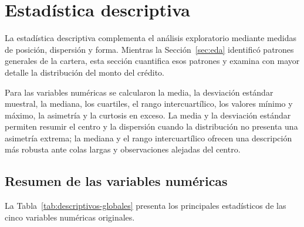 \section{Estadística descriptiva}
\label{sec:descriptiva}

La estadística descriptiva complementa el análisis exploratorio mediante
medidas de posición, dispersión y forma. Mientras la
Sección~\ref{sec:eda} identificó patrones generales de la cartera, esta
sección cuantifica esos patrones y examina con mayor detalle la
distribución del monto del crédito.

Para las variables numéricas se calcularon la media, la desviación
estándar muestral, la mediana, los cuartiles, el rango intercuartílico,
los valores mínimo y máximo, la asimetría y la curtosis en exceso. La
media y la desviación estándar permiten resumir el centro y la dispersión
cuando la distribución no presenta una asimetría extrema; la mediana y
el rango intercuartílico ofrecen una descripción más robusta ante colas
largas y observaciones alejadas del centro.

\subsection{Resumen de las variables numéricas}

La Tabla~\ref{tab:descriptivos-globales} presenta los principales
estadísticos de las cinco variables numéricas originales.

